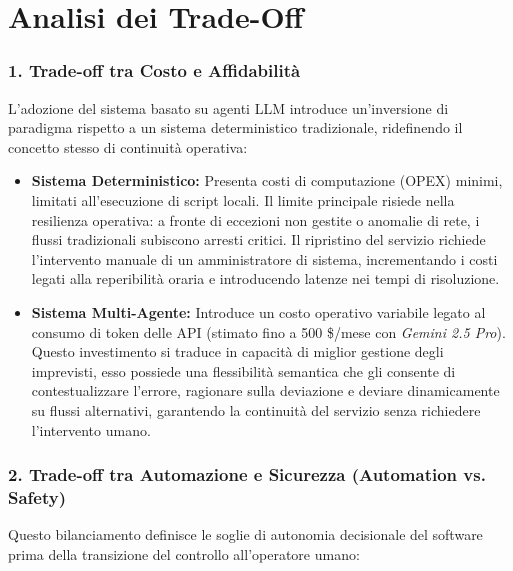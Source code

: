 \section{Analisi dei Trade-Off}
\label{sec:analisi_tradeoff}
\subsubsection*{1. Trade-off tra Costo e Affidabilità}
L'adozione del sistema basato su agenti LLM introduce un'inversione di paradigma rispetto a un sistema deterministico tradizionale, ridefinendo il concetto stesso di continuità operativa:

\begin{itemize}
    \item \textbf{Sistema Deterministico:} Presenta costi di computazione (OPEX) minimi, limitati all'esecuzione di script locali. Il limite principale risiede nella resilienza operativa: a fronte di eccezioni non gestite o anomalie di rete, i flussi tradizionali subiscono arresti critici. Il ripristino del servizio richiede l'intervento manuale di un amministratore di sistema, incrementando i costi legati alla reperibilità oraria e introducendo latenze nei tempi di risoluzione.
    \item \textbf{Sistema Multi-Agente:} Introduce un costo operativo variabile legato al consumo di token delle API (stimato fino a 500 \$/mese con \textit{Gemini 2.5 Pro}). Questo investimento si traduce in capacità di miglior gestione degli imprevisti, esso possiede una flessibilità semantica che gli consente di contestualizzare l'errore, ragionare sulla deviazione e deviare dinamicamente su flussi alternativi, garantendo la continuità del servizio senza richiedere l'intervento umano.
\end{itemize}

\subsubsection*{2. Trade-off tra Automazione e Sicurezza (Automation vs. Safety)}
Questo bilanciamento definisce le soglie di autonomia decisionale del software prima della transizione del controllo all'operatore umano:

